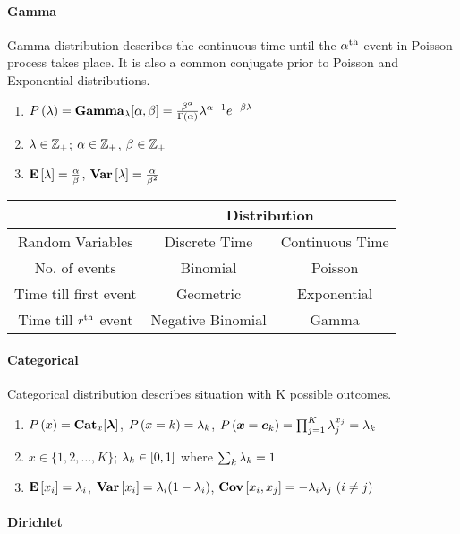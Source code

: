 \paragraph{Gamma}

Gamma distribution describes the continuous time until the $\alpha^\text{th}$ event in Poisson process takes place. It is also a common conjugate prior to Poisson and Exponential distributions.
\begin{enumerate}
	\item $P\left(\lambda\right)=\mathbf{Gamma}_\lambda[\alpha,\beta]=\frac{\beta^\alpha}{\Gamma(\alpha)}\lambda^{\alpha-1}e^{-\beta\lambda}$
	\item $\lambda\in\mathbb{Z}_+$; $\alpha\in\mathbb{Z}_+$, $\beta\in\mathbb{Z}_+$
	\item $\mathbf{E}\left[\lambda\right]=\frac{\alpha}{\beta}$, $\mathbf{Var}\left[\lambda\right]=\frac{\alpha}{\beta^2}$
\end{enumerate}

\begin{table*}[!h]
	\centering
	\begin{tabular}{|c|c|c|}
		\hline
		& \multicolumn{2}{|c|}{Distribution} \\
		\hline
		Random Variables & Discrete Time & Continuous Time \\
		\hline\hline
		No. of events & Binomial & Poisson \\
		\hline
		Time till first event & Geometric & Exponential \\
		\hline
		Time till $r^\text{th}$ event & Negative Binomial & Gamma \\
		\hline
	\end{tabular}
\end{table*}

\paragraph{Categorical}

Categorical distribution describes situation with K possible outcomes.
\begin{enumerate}
	\item $P\left(x\right)=\mathbf{Cat}_x[\boldsymbol{\lambda}]$, $P\left(x=k\right)=\lambda_k$,  $P\left(\boldsymbol{x}=\boldsymbol{e}_k\right)=\prod_{j=1}^K\lambda_j^{x_j}=\lambda_k$
	\item $x \in \{1,2,\dotsc,K\}$; $\lambda_k \in [0,1]$ where $\sum_k\lambda_k=1$
	\item $\mathbf{E}\left[x_i\right]=\lambda_i$, $\mathbf{Var}\left[x_i\right]=\lambda_i(1-\lambda_i)$, $\mathbf{Cov}\left[x_i,x_j\right]=-\lambda_i\lambda_j\ (i \neq j)$
\end{enumerate}

\paragraph{Dirichlet}

